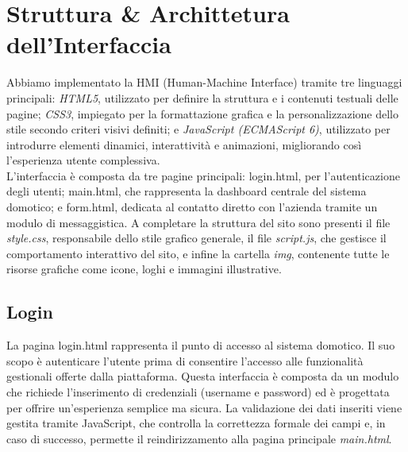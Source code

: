 \documentclass[italian, 12pt, a4paper]{article}
\begin{document}
\section{Struttura \& Archittetura dell'Interfaccia}\label{sec:descrizione}
Abbiamo implementato la HMI (Human-Machine Interface) tramite tre linguaggi principali: \emph{HTML5}, utilizzato per definire la struttura e i contenuti testuali delle pagine; \emph{CSS3}, impiegato per la formattazione grafica e la personalizzazione dello stile secondo criteri visivi definiti; e \emph{JavaScript (ECMAScript 6)}, utilizzato per introdurre elementi dinamici, interattività e animazioni, migliorando così l’esperienza utente complessiva.\\
L'interfaccia è composta da tre pagine principali: login.html, per l'autenticazione degli utenti; main.html, che rappresenta la dashboard centrale del sistema domotico; e form.html, dedicata al contatto diretto con l’azienda tramite un modulo di messaggistica.
A completare la struttura del sito sono presenti il file \emph{style.css}, responsabile dello stile grafico generale, il file \emph{script.js}, che gestisce il comportamento interattivo del sito, e infine la cartella \emph{img}, contenente tutte le risorse grafiche come icone, loghi e immagini illustrative.

\subsection{Login}
La pagina login.html rappresenta il punto di accesso al sistema domotico. Il suo scopo è autenticare l’utente prima di consentire l'accesso alle funzionalità gestionali offerte dalla piattaforma. Questa interfaccia è composta da un modulo che richiede l’inserimento di credenziali (username e password) ed è progettata per offrire un’esperienza semplice ma sicura. La validazione dei dati inseriti viene gestita tramite JavaScript, che controlla la correttezza formale dei campi e, in caso di successo, permette il reindirizzamento alla pagina principale \emph{main.html}.
\end{document}
